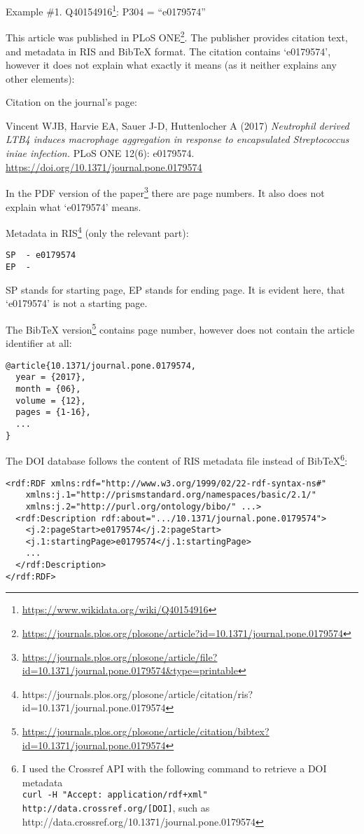 Example \#1. Q40154916\footnote{\url{https://www.wikidata.org/wiki/Q40154916}}: P304 = ``e0179574''

This article was published in PLoS ONE\footnote{\url{https://journals.plos.org/plosone/article?id=10.1371/journal.pone.0179574}}. The publisher provides citation text, and metadata in RIS and BibTeX format. The citation contains `e0179574', however it does not explain what exactly it means (as it neither explains any other elements):

Citation on the journal's page:

Vincent WJB, Harvie EA, Sauer J-D, Huttenlocher A (2017) \emph{Neutrophil derived LTB4 induces macrophage aggregation in response to encapsulated Streptococcus iniae infection.} PLoS ONE 12(6): e0179574. \url{https://doi.org/10.1371/journal.pone.0179574}

In the PDF version of the paper\footnote{\url{https://journals.plos.org/plosone/article/file?id=10.1371/journal.pone.0179574&type=printable}} there are page numbers. It also does not explain what `e0179574' means. 

Metadata in RIS\footnote{https://journals.plos.org/plosone/article/citation/ris?id=10.1371/journal.pone.0179574} (only the relevant part):
\begin{lstlisting}
SP  - e0179574
EP  - 
\end{lstlisting}

SP stands for starting page, EP stands for ending page. It is evident here, that `e0179574' is not a starting page.

The BibTeX version\footnote{\url{https://journals.plos.org/plosone/article/citation/bibtex?id=10.1371/journal.pone.0179574}} contains page number, however does not contain the article identifier at all:
\begin{lstlisting}
@article{10.1371/journal.pone.0179574,
  year = {2017},
  month = {06},
  volume = {12},
  pages = {1-16},
  ...
}
\end{lstlisting}

The DOI database follows the content of RIS metadata file instead of BibTeX\footnote{I used the Crossref API with the following command to retrieve a DOI metadata\\
\texttt{curl -H "Accept: application/rdf+xml" http://data.crossref.org/[DOI]}, such as http://data.crossref.org/10.1371/journal.pone.0179574}:

\begin{lstlisting}
<rdf:RDF xmlns:rdf="http://www.w3.org/1999/02/22-rdf-syntax-ns#"
    xmlns:j.1="http://prismstandard.org/namespaces/basic/2.1/"
    xmlns:j.2="http://purl.org/ontology/bibo/" ...>
  <rdf:Description rdf:about=".../10.1371/journal.pone.0179574">
    <j.2:pageStart>e0179574</j.2:pageStart>
    <j.1:startingPage>e0179574</j.1:startingPage>
    ...
  </rdf:Description>
</rdf:RDF>
\end{lstlisting}

